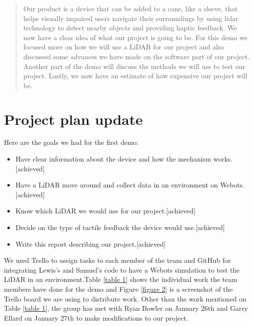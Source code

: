 \documentclass{article}
\begin{document}
 



\begin{abstract} 
Our product is a device that can be added to a cane, like a sleeve, that helps visually impaired users navigate their surroundings by using lidar technology to detect nearby objects and providing haptic feedback. We now have a clear idea of what our project is going to be. For this demo we focused more on how we will use a LiDAR for our project and also discussed some advances we have made on the software part of our project. Another part of the demo will discuss the methods we will use to test our project. Lastly, we now have an estimate of how expensive our project will be.
\end{abstract} 


\section{Project plan update} 

Here are the goals we had for the first demo:
\begin{itemize}
    \item Have clear information about the device and how the mechanism works.[achieved]
    \item Have a LiDAR move around and collect data in an environment on Webots.[achieved]
    \item Know which LiDAR we would use for our project.[achieved]
    \item Decide on the type of tactile feedback the device would use.[achieved]
    \item Write this report describing our project.[achieved]

    
\end{itemize}


We used Trello to assign tasks to each member of the team and GitHub for integrating Lewis’s and Samuel’s code to have a Webots simulation to test the LiDAR in an environment.Table \ref{table 1} shows the individual work the team members have done for the demo and Figure \ref{figure 2} is a screenshot of the Trello board we are using to distribute work. Other than the work mentioned on Table \ref{table 1}, the group has met with Ryan Bowler on January 26th and Garry Ellard on January 27th to make modifications to our project.
\end{document}
